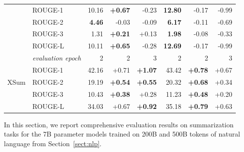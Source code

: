 \documentclass{article}
\theoremstyle{plain}
\theoremstyle{definition}
\theoremstyle{remark}
\begin{document}
\begin{table}[b!]
{\begin{tabular}{llrrrrrr}
 &    ROUGE-1 & 10.16 &    \textbf{+0.67} &    -0.23 &  \textbf{12.80} &        -0.17 &        -0.99 \\
 &    ROUGE-2 &  \textbf{4.46} &    -0.03 &    -0.09 &   \textbf{6.17} &        -0.11 &        -0.69 \\
 &    ROUGE-3 &  1.31 &    \textbf{+0.21} &    +0.13 &   \textbf{1.98} &        -0.08 &        -0.33 \\
 &    ROUGE-L & 10.11 &    \textbf{+0.65} &    -0.28 &  \textbf{12.69} &        -0.17 &        -0.99 \\
 \midrule
\multirow{5}{*}{XSum \citep{narayan2018dont}} 
 & \textit{evaluation epoch} & 2 & 2 & 3 &  2 &  2 &  3 \\
 &    ROUGE-1 & 42.16 &     +0.71 &     \textbf{+1.07} &  43.42 &         \textbf{+0.78} &         +0.67 \\
 &    ROUGE-2 & 19.19 &     \textbf{+0.54} &     \textbf{+0.55} &  20.32 &         \textbf{+0.68} &         +0.34 \\
 &    ROUGE-3 & 10.43 &     \textbf{+0.38} &     +0.28 &  11.23 &         \textbf{+0.48} &         +0.20 \\
 &    ROUGE-L & 34.03 &     +0.67 &     \textbf{+0.92} &  35.18 &         \textbf{+0.79} &         +0.63 \\
\bottomrule
\end{tabular}
}

\end{table}

In this section, we report comprehensive evaluation results on summarization tasks for the 7B parameter models trained on 200B and 500B tokens of natural language from Section~\ref{sect:nlp}.
\end{document}
